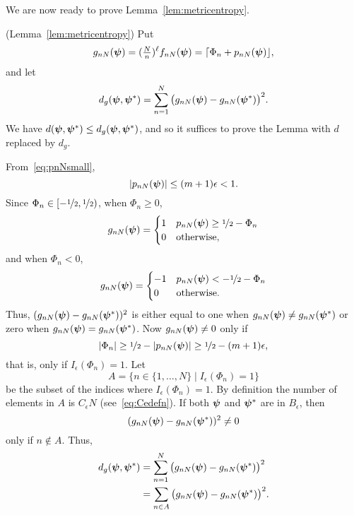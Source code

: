 \documentclass[journal]{IEEEtran}
\begin{document}
We are now ready to prove Lemma~\ref{lem:metricentropy}.

\begin{IEEEproof} (Lemma~\ref{lem:metricentropy})
Put 
\[
g_{nN}(\boldsymbol{\psi}) = (\tfrac{N}{n})^\ell f_{nN}(\boldsymbol{\psi}) = {\left\lceil  \Phi_n + p_{nN}(\boldsymbol{\psi}) \right\rfloor},
\]
and let
\[
d_g(\boldsymbol{\psi}, \boldsymbol{\psi}^*) = \sum_{n=1}^{N} \big( g_{nN}(\boldsymbol{\psi}) - g_{nN}(\boldsymbol{\psi}^*) \big)^2.
\]
We have $d(\boldsymbol{\psi}, \boldsymbol{\psi}^*) \leq d_g(\boldsymbol{\psi}, \boldsymbol{\psi}^*)$, and so it suffices to prove the Lemma with $d$ replaced by $d_g$.  

From~\eqref{eq:pnNsmall}, 
\[
\left\vert p_{nN}(\boldsymbol{\psi}) \right\vert \leq (m+1)\epsilon < 1.
\]
Since $\Phi_n \in [-\nicefrac{1}{2}, \nicefrac{1}{2})$, when $\Phi_n \geq 0$,
\[
g_{nN}(\boldsymbol{\psi}) = \begin{cases}
1 & p_{nN}(\boldsymbol{\psi}) \geq \nicefrac{1}{2} - \Phi_n \\
0 & \text{otherwise},
\end{cases}
\]
and when $\Phi_n < 0$,
\[
g_{nN}(\boldsymbol{\psi}) = \begin{cases}
-1 & p_{nN}(\boldsymbol{\psi}) < -\nicefrac{1}{2} - \Phi_n \\
0 & \text{otherwise}.
\end{cases}
\]
Thus, $( g_{nN}(\boldsymbol{\psi}) - g_{nN}(\boldsymbol{\psi}^*) )^2$ is either equal to one when $g_{nN}(\boldsymbol{\psi}) \neq g_{nN}(\boldsymbol{\psi}^*)$ or zero when $g_{nN}(\boldsymbol{\psi}) = g_{nN}(\boldsymbol{\psi}^*)$.  Now $g_{nN}(\boldsymbol{\psi}) \neq 0$ only if 
\[
\left\vert \Phi_n \right\vert \geq \nicefrac{1}{2} - \left\vert p_{nN}(\boldsymbol{\psi}) \right\vert \geq \nicefrac{1}{2} - (m+1)\epsilon,
\]
that is, only if $I_\epsilon(\Phi_n) = 1$.  Let
\[
A = \{ n \in \{1, \dots, N\} \mid I_\epsilon(\Phi_n) = 1 \}
\]
be the subset of the indices where $I_\epsilon(\Phi_n) = 1$.  By definition the number of elements in $A$ is $C_\epsilon N$ (see~\eqref{eq:Cedefn}).  If both $\boldsymbol{\psi}$ and $\boldsymbol{\psi}^*$ are in $B_\epsilon$, then 
\[
( g_{nN}(\boldsymbol{\psi}) - g_{nN}(\boldsymbol{\psi}^*) )^2 \neq 0 
\]
only if $n \notin A$.  Thus,
\begin{align*}
d_g(\boldsymbol{\psi}, \boldsymbol{\psi}^*) &= \sum_{n=1}^{N} \big( g_{nN}(\boldsymbol{\psi}) - g_{nN}(\boldsymbol{\psi}^*) \big)^2 \\
&= \sum_{n \in A} \big( g_{nN}(\boldsymbol{\psi}) - g_{nN}(\boldsymbol{\psi}^*) \big)^2.
\end{align*}


\end{IEEEproof}
\end{document}
